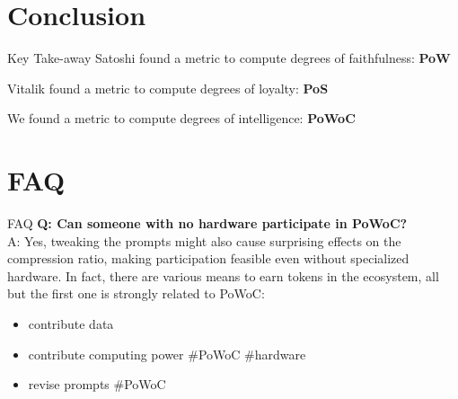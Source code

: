 \documentclass{beamer}
\begin{document}
\section{Conclusion}
\begin{frame}{Key Take-away}
Satoshi found a metric to compute degrees of faithfulness: \textbf{PoW}

Vitalik found a metric to compute degrees of loyalty: \textbf{PoS}

We found a metric to compute degrees of intelligence: \textbf{PoWoC}
\end{frame}



\section{FAQ}
\begin{frame}{FAQ}
\textbf{Q: Can someone with no hardware participate in PoWoC?} \\
A: Yes, tweaking the prompts might also cause surprising effects on the compression ratio, making participation feasible even without specialized hardware. In fact, there are various means to earn tokens in the ecosystem, all but the first one is strongly related to PoWoC:
\begin{itemize}
\item contribute data
\item contribute computing power \#PoWoC \#hardware
\item revise prompts \#PoWoC
\end{itemize}
\end{frame}
\end{document}

